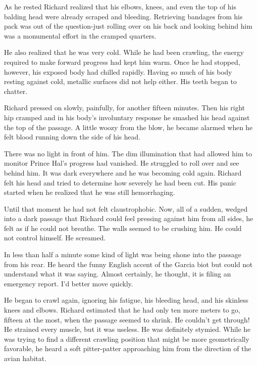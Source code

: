 \documentclass[]{article}
\begin{document}
{As he rested Richard realized that his elbows, knees, and even the top of his balding head were already scraped and bleeding.  Retrieving bandages from his pack was out of the question-just rolling over on his back and looking behind him was a monumental effort in the cramped quarters.

He also realized that he was very cold.  While he had been crawling, the energy required to make forward progress had kept him warm.  Once he had stopped, however, his exposed body had chilled rapidly.  Having so much of his body resting against cold, metallic surfaces did not help either.  His teeth began to chatter.

Richard pressed on slowly, painfully, for another fifteen minutes.  Then his right hip cramped and in his body’s involuntary response he smashed his head against the top of the passage.  A little woozy from the blow, he became alarmed when he felt blood running down the side of his head.

There was no light in front of him.  The dim illumination that had allowed him to monitor Prince Hal’s progress had vanished.  He struggled to roll over and see behind him.  It was dark everywhere and he was becoming cold again.  Richard felt his head and tried to determine how severely he had been cut.  His panic started when he realized that he was still hemorrhaging.

Until that moment he had not felt claustrophobic.  Now, all of a sudden, wedged into a dark passage that Richard could feel pressing against him from all sides, he felt as if he could not breathe.  The walls seemed to be crushing him.  He could not control himself.  He screamed.

In less than half a minute some kind of light was being shone into the passage from his rear.  He heard the funny English accent of the Garcia biot but could not understand what it was saying.  Almost certainly, he thought, it is filing an emergency report.  I’d better move quickly.

He began to crawl again, ignoring his fatigue, his bleeding head, and his skinless knees and elbows.  Richard estimated that he had only ten more meters to go, fifteen at the most, when the passage seemed to shrink.  He couldn’t get through! He strained every muscle, but it was useless.  He was definitely stymied.  While he was trying to find a different crawling position that might be more geometrically favorable, he heard a soft pitter-patter approaching him from the direction of the avian habitat.

}
\end{document}
